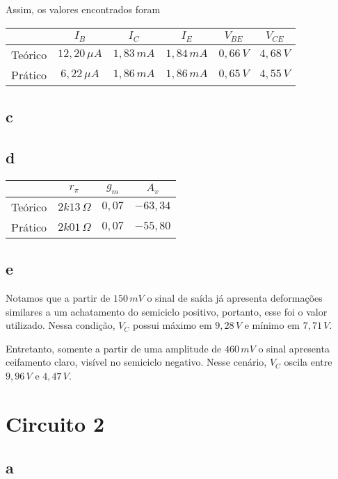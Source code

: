 \documentclass[a4paper]{report}
\begin{document}
Assim, os valores encontrados foram
\begin{table}[H]
    \centering
    \begin{tabular}{c | c | c | c | c | c}
	 & $I_B$ & $I_C$ & $I_E$ & $V_{BE}$ & $V_{CE}$ \\
	 \hline
	Teórico & $12,20\,\mu A$ & $1,83\,mA$ & $1,84\,mA$ & $0,66\,V$ & $4,68\,V$ \\
	Prático & $6,22\,\mu A$ & $1,86\,mA$ & $1,86\,mA$ & $0,65\,V$ & $4,55\,V$
    \end{tabular}
\end{table}

\subsection*{c}

\subsection*{d}

\begin{table}[H]
    \centering
    \begin{tabular}{c | c | c | c}
     & $r_\pi$ & $g_m$ & $A_v$ \\
     \hline
	Teórico & $2k13\,\Omega$ & $0,07$ & $-63,34$ \\
	Prático & $2k01\,\Omega$ & $0,07$ & $-55,80$
    \end{tabular}
\end{table}

\subsection*{e}

Notamos que a partir de $150\,mV$ o sinal de saída já apresenta deformações similares a um achatamento do semiciclo positivo, portanto, esse foi o valor utilizado. Nessa condição, $V_C$ possui máximo em $9,28\,V$ e mínimo em $7,71\,V$.

Entretanto, somente a partir de uma amplitude de $460\,mV$ o sinal apresenta ceifamento claro, visível no semiciclo negativo. Nesse cenário, $V_C$ oscila entre $9,96\,V$ e $4,47\,V$.

\section*{Circuito 2}

\subsection*{a}
\end{document}

